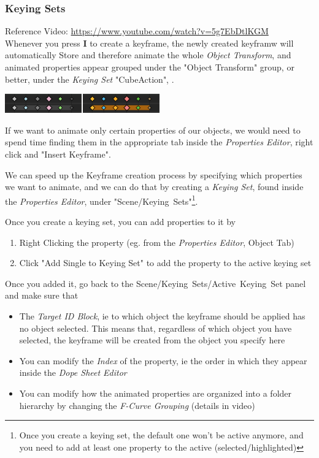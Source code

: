 \documentclass{article}
\begin{document}
\subsubsection{Keying Sets}
Reference Video: \href{https://www.youtube.com/watch?v=5g7EbDtlKGM}{https://www.youtube.com/watch?v=5g7EbDtlKGM}\\
Whenever you press \textbf{I} to create a keyframe, the newly created keyframw will automatically Store and therefore animate the whole \textit{Object Transform}, and animated properties 
appear grouped under the "Object Transform" group, or better, under the \textit{Keying Set} "CubeAction", .
\begin{center}
    \includegraphics[width=0.5\textwidth]{blender_docs_images/keyframe_types.png}
\end{center}
If we want to animate only certain properties of our objects, we would need to spend time finding them in the appropriate tab inside the \textit{Properties Editor}, 
right click and "Insert Keyframe".\par
We can speed up the Keyframe creation process by specifying which properties we want to animate, and we can do that by creating a \textit{Keying Set}, found inside the \textit{Properties Editor}, under 
\mbox{"Scene/Keying Sets"}\footnote{Once you create a keying set, the default one won't be active anymore, and you need to add at least one property to the active (selected/highlighted)}.\par
Once you create a keying set, you can add properties to it by
\begin{enumerate}[noitemsep, topsep=0pt]
    \item Right Clicking the property (eg. from the \textit{Properties Editor}, Object Tab)
    \item Click "Add Single to Keying Set" to add the property to the active keying set
\end{enumerate}
Once you added it, go back to the \mbox{Scene/Keying Sets/Active Keying Set} panel and make sure that
\begin{itemize}[noitemsep, topsep=0pt]
    \item The \textit{Target ID Block}, ie to which object the keyframe should be applied has no object selected. This means that, regardless of which object you have selected, the keyframe will be 
      created from the object you specify here
    \item You can modify the \textit{Index} of the property, ie the order in which they appear inside the \textit{Dope Sheet Editor}
    \item You can modify how the animated properties are organized into a folder hierarchy by changing the \textit{F-Curve Grouping} (details in video)
\end{itemize}
\end{document}
